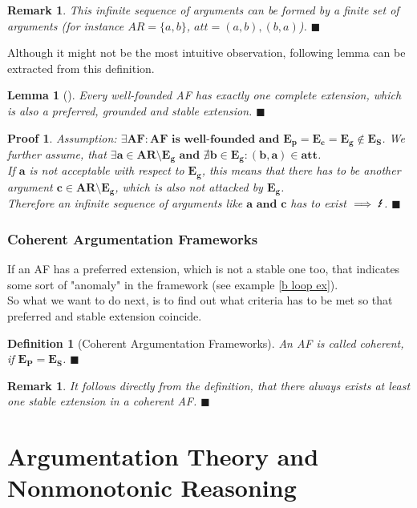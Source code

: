 \documentclass[12pt]{report}
\numberwithin{figure}{chapter}
\theoremstyle{break}
\newtheorem{defn}{Definition}[chapter]
\newtheorem{lem}{Lemma}[chapter]
\newtheorem*{prf}{Proof}
\newtheorem*{rmrk}{Remark}
\newtheorem*{frmrk}{Remark}
\newenvironment{mydefn}{\begin{defn}}{$\blacksquare$ \end{defn}}
\newenvironment{mylem}{\begin{lem}}{$\blacksquare$ \end{lem}}
\newenvironment{myprf}{\begin{prf}}{$\blacksquare$ \end{prf}}
\newenvironment{myrmrk}{\begin{rmrk}}{$\blacksquare$ \end{rmrk}}
\newenvironment{myfrmrk}{\begin{frmrk}}{$\blacksquare$ \end{frmrk}}
\begin{document}
\begin{myfrmrk}
This infinite sequence of arguments can be formed by a finite set of arguments (for instance $AR=\{a,b\}$, $att={(a,b),(b,a)}$).
\end{myfrmrk}

\newpage

Although it might not be the most intuitive observation, following lemma can be extracted from this definition.
\begin{mylem}[\cite{Dung}]
Every well-founded AF has exactly one complete extension, which is also a preferred, grounded and stable extension.
\end{mylem}

\begin{myprf}
Assumption: $\bm{\exists AF: \text{AF is well-founded and } E_{p}=E_{c}=E_{g} \notin E_{S}}$.
We further assume, that $\bm{\exists a \in AR \text{\textbackslash} E_{g} \text{ and } \nexists b \in E_{g}:(b,a) \in att}$.\\
\bigskip
If $\bm{a}$ is not acceptable with respect to $\bm{E_{g}}$, this means that there has to be another argument $\bm{c \in AR \text{\textbackslash} E_{g}}$, 
which is also not attacked by $\bm{E_{g}}$. \\ Therefore an infinite sequence of arguments like $\bm{a \text{ and }c}$ has to exist $\implies \text{\Lightning}$.
\end{myprf}

\subsection{Coherent Argumentation Frameworks}
If an AF has a preferred extension, which is not a stable one too, that indicates some sort of "anomaly" in the framework (see example \ref{b loop ex}).\\
So what we want to do next, is to find out what criteria has to be met so that preferred and stable extension coincide.

\begin{mydefn}[Coherent Argumentation Frameworks]
An AF is called coherent, if $\bm{E_{P} = E_{S}}$.
\end{mydefn}

\begin{myrmrk}
It follows directly from the definition, that there always exists at least one stable extension in a coherent AF.
\end{myrmrk}

\chapter{Argumentation Theory and Nonmonotonic Reasoning}
\end{document}
